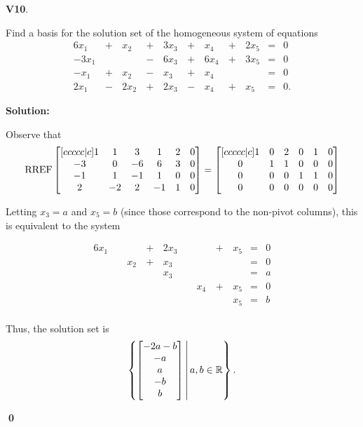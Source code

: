 \documentclass{article}
\newenvironment{problem}[1]
{
  \begin{flushleft}
  \textbf{#1}.
  \ignorespaces
}
{
  \end{flushleft}
}
\newenvironment{solution}
{
  \ignorespaces
  \textbf{Solution:}
}
{
  \ignorespacesafterend
  \begin{flushright}
  {\bfseries \qed}
  \end{flushright}
}
\begin{document}
\begin{problem}{V10}
Find a basis for the solution set of the homogeneous system of equations
\begin{alignat*}{6}
x_1 &\,+\,& x_2 &\,+\,& 3x_3 &\,+\,& x_4 &\,+\,& 2x_5 &=& 0 \\
-3x_1 &\,\,&  &\,-\,& 6x_3 &\,+\,&6 x_4 &\,+\,& 3x_5 &=& 0 \\
-x_1 &\,+\,& x_2 &\,-\,& x_3 &\,+\,& x_4 &\,\,&  &=& 0 \\
2x_1 &\,-\,& 2x_2 &\,+\,& 2x_3 &\,-\,& x_4 &\,+\,& x_5 &=& 0 .
\end{alignat*}
\end{problem}
\begin{solution}
Observe that
\[ \operatorname{RREF}
    \begin{bmatrix}[ccccc|c]
    1 & 1 & 3 & 1 & 2 & 0\\
    -3 & 0 & -6 & 6 & 3 & 0\\
    -1 & 1 & -1 & 1 & 0 & 0\\
    2 & -2 & 2 & -1 & 1& 0
    \end{bmatrix} =
    \begin{bmatrix}[ccccc|c]
    1 & 0 & 2 & 0 & 1 &0\\
    0 & 1 & 1 & 0 & 0 &0\\
    0 & 0 & 0 & 1 & 1 &0\\
    0 & 0 & 0 & 0 & 0&0
    \end{bmatrix}
\]

Letting \(x_3=a\) and \(x_5=b\)
(since those correspond to the non-pivot columns),
this is equivalent to the system

\begin{alignat*}{6}
x_1 &\,\,&  &\,+\,& 2x_3 &\,\,&  &\,+\,& x_5 &=& 0 \\
 &\,\,& x_2 &\,+\,& x_3 &\,\,& &\,\,&  &=& 0 \\
 &\,\,&  &\,\,& x_3 &\,\,&  &\,\,&  &=& a \\
 &\,\,&  &\,\,&  &\,\,& x_4 &\,+\,& x_5 &=& 0 \\
 &\,\,&  &\,\,&  &\,\,&  &\,\,& x_5 &=& b \\
\end{alignat*}

Thus, the solution set is
\[ \left\{\begin{bmatrix} -2a-b \\ -a \\ a \\ -b \\ b \end{bmatrix}\,\middle|\,a,b \in \mathbb{R}\right\} .\]


\end{solution}
\end{document}
